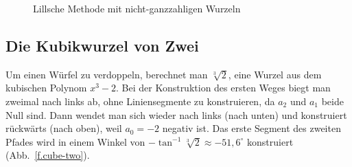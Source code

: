 \begin{figure}[t]
\begin{center}
\end{center}
\caption{Lillsche Methode mit nicht-ganzzahligen Wurzeln}\label{f.noninteger}
\end{figure}

\subsection{Die Kubikwurzel von Zwei}\label{s.cube}
Um einen Würfel zu verdoppeln, berechnet man $\sqrt[3]{2}$, eine Wurzel aus dem kubischen Polynom $x^3-2$. Bei der Konstruktion des ersten Weges biegt man zweimal nach links ab, ohne Liniensegmente zu konstruieren, da $a_2$ und $a_1$ beide Null sind. Dann wendet man sich wieder nach links (nach unten) und konstruiert rückwärts (nach oben), weil $a_0=-2$ negativ ist. Das erste Segment des zweiten Pfades wird in einem Winkel von $-\tan^{-1} \sqrt[3]{2}\approx -51,6^\circ$ konstruiert (Abb.~\ref{f.cube-two}).
